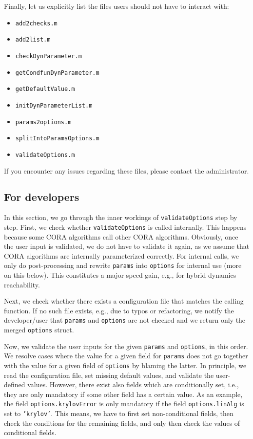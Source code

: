 Finally, let us explicitly list the files users should not have to interact with:
\begin{itemize}
	\item \texttt{add2checks.m}
	\item \texttt{add2list.m}
	\item \texttt{checkDynParameter.m}
	\item \texttt{getCondfunDynParameter.m}
	\item \texttt{getDefaultValue.m}
	\item \texttt{initDynParameterList.m}
	\item \texttt{params2options.m}
	\item \texttt{splitIntoParamsOptions.m}
	\item \texttt{validateOptions.m}
\end{itemize}

If you encounter any issues regarding these files, please contact the administrator.



\subsection{For developers}
\label{ssec:inputvalidation_devs}

In this section, we go through the inner workings of \texttt{validateOptions} step by step.
First, we check whether \texttt{validateOptions} is called internally.
This happens because some CORA algorithms call other CORA algorithms.
Obviously, once the user input is validated, we do not have to validate it again, as we assume that CORA algorithms are internally parameterized correctly.
For internal calls, we only do post-processing and rewrite \texttt{params} into \texttt{options} for internal use (more on this below).
This constitutes a major speed gain, e.g., for hybrid dynamics reachability.

Next, we check whether there exists a configuration file that matches the calling function.
If no such file exists, e.g., due to typos or refactoring, we notify the developer/user that \texttt{params} and \texttt{options} are not checked and we return only the merged \texttt{options} struct.

Now, we validate the user inputs for the given \texttt{params} and \texttt{options}, in this order.
We resolve cases where the value for a given field for \texttt{params} does not go together with the value for a given field of \texttt{options} by blaming the latter.
In principle, we read the configuration file, set missing default values, and validate the user-defined values.
However, there exist also fields which are conditionally set, i.e., they are only mandatory if some other field has a certain value.
As an example, the field \texttt{options.krylovError} is only mandatory if the field \texttt{options.linAlg} is set to \texttt{'krylov'}.
This means, we have to first set non-conditional fields, then check the conditions for the remaining fields, and only then check the values of conditional fields.


